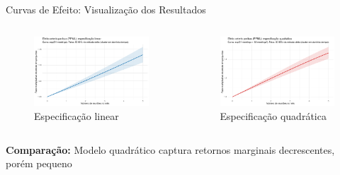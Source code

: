 \documentclass[aspectratio=169]{beamer}
\begin{document}
\begin{frame}{Curvas de Efeito: Visualização dos Resultados}
  \begin{columns}
    \begin{column}{0.5\textwidth}
    \begin{figure}
    \centering
    \includegraphics[width=\textwidth]{figures/fig8_effect_linear_ppml.pdf}
    \caption{Especificação linear}
    \end{figure}
  \end{column}
    \begin{column}{0.5\textwidth}
    \begin{figure}
    \centering
    \includegraphics[width=\textwidth]{figures/fig9_effect_quadratic_ppml.pdf}
    \caption{Especificação quadrática}
    \end{figure}
    \end{column}
  \end{columns}
  
  \textbf{Comparação:} Modelo quadrático captura retornos marginais decrescentes, porém pequeno
\end{frame}
\end{document}
